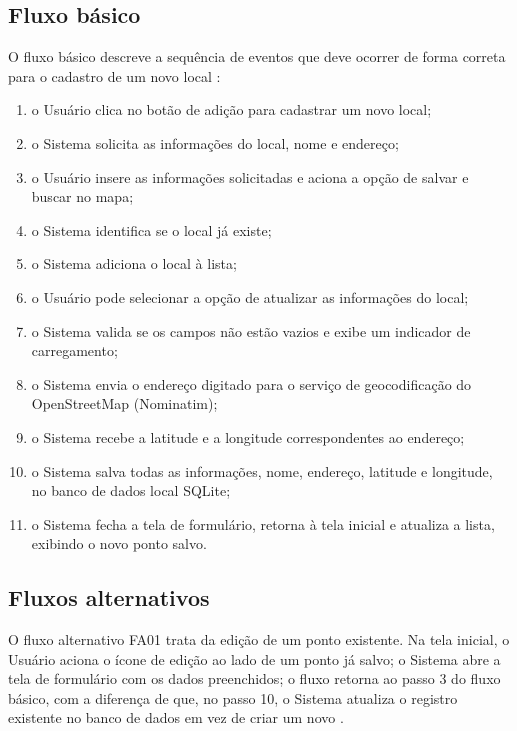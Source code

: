 \subsection{Fluxo básico}

O fluxo básico descreve a sequência de eventos que deve ocorrer de forma correta para o cadastro de um novo local \cite{sriEspecUC2026}:

\begin{enumerate}
    \item o Usuário clica no botão de adição para cadastrar um novo local;
    \item o Sistema solicita as informações do local, nome e endereço;
    \item o Usuário insere as informações solicitadas e aciona a opção de salvar e buscar no mapa;
    \item o Sistema identifica se o local já existe;
    \item o Sistema adiciona o local à lista;
    \item o Usuário pode selecionar a opção de atualizar as informações do local;
    \item o Sistema valida se os campos não estão vazios e exibe um indicador de carregamento;
    \item o Sistema envia o endereço digitado para o serviço de geocodificação do OpenStreetMap (Nominatim);
    \item o Sistema recebe a latitude e a longitude correspondentes ao endereço;
    \item o Sistema salva todas as informações, nome, endereço, latitude e longitude, no banco de dados local SQLite;
    \item o Sistema fecha a tela de formulário, retorna à tela inicial e atualiza a lista, exibindo o novo ponto salvo.
\end{enumerate}

\subsection{Fluxos alternativos}

O fluxo alternativo FA01 trata da edição de um ponto existente. Na tela inicial, o Usuário aciona o ícone de edição ao lado de um ponto já salvo; o Sistema abre a tela de formulário com os dados preenchidos; o fluxo retorna ao passo 3 do fluxo básico, com a diferença de que, no passo 10, o Sistema atualiza o registro existente no banco de dados em vez de criar um novo \cite{sriEspecUC2026}.

